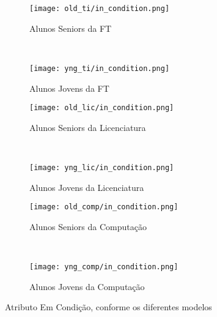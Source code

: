 \clearpage
\begin{figure}[!ht]
    \centering
    \begin{subfigure}[b]{0.48\textwidth}
        \centering
        \texttt{[image: old\_ti/in\_condition.png]}
        \caption{Alunos Seniors da FT}
    \end{subfigure}
    ~
    \begin{subfigure}[b]{0.48\textwidth}
        \centering
        \texttt{[image: yng\_ti/in\_condition.png]}
        \caption{Alunos Jovens da FT}
    \end{subfigure}

    \begin{subfigure}[b]{0.48\textwidth}
        \centering
        \texttt{[image: old\_lic/in\_condition.png]}
        \caption{Alunos Seniors da Licenciatura}
    \end{subfigure}
    ~
    \begin{subfigure}[b]{0.48\textwidth}
        \centering
        \texttt{[image: yng\_lic/in\_condition.png]}
        \caption{Alunos Jovens da Licenciatura}
    \end{subfigure}

    \begin{subfigure}[b]{0.48\textwidth}
        \centering
        \texttt{[image: old\_comp/in\_condition.png]}
        \caption{Alunos Seniors da Computação}
    \end{subfigure}
    ~
    \begin{subfigure}[b]{0.48\textwidth}
        \centering
        \texttt{[image: yng\_comp/in\_condition.png]}
        \caption{Alunos Jovens da Computação}
    \end{subfigure}
    \caption{Atributo Em Condição, conforme os diferentes modelos}
\end{figure}

